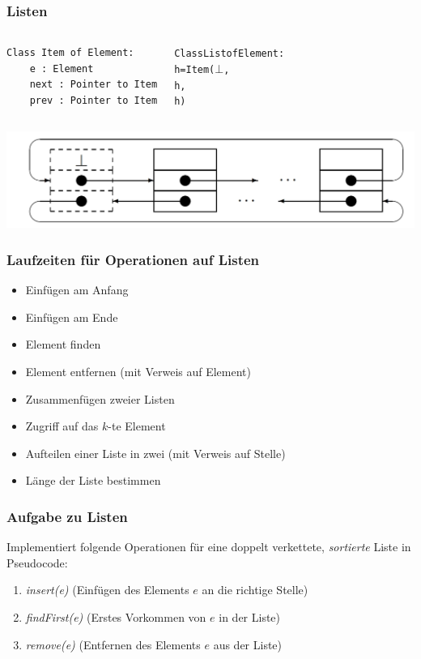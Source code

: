 \begin{frame}[fragile]
	\frametitle{Listen}
	\begin{columns}[t]
\begin{verbatim}
Class Item of Element:
    e : Element
    next : Pointer to Item
    prev : Pointer to Item
\end{verbatim}
\begin{alltt}
Class List of Element:
    h = Item(\(\bot\),
      h,
      h)
\end{alltt}
	\end{columns}
	\includegraphics[width=\textwidth]{images/list}
\end{frame}

\begin{frame}
	\frametitle{Laufzeiten für Operationen auf Listen}
	\begin{itemize}
		\item Einfügen am Anfang \only<2->{\textbf{$\mathcal{O}(1)$}}
		\item Einfügen am Ende \only<3->{\textbf{$\mathcal{O}(1)$}}
		\item Element finden \only<4->{\textbf{$\mathcal{O}(n)$}}
		\item Element entfernen (mit Verweis auf Element) \only<5->{\textbf{$\mathcal{O}(1)$}}
		\item Zusammenfügen zweier Listen \only<6->{\textbf{$\mathcal{O}(1)$}}
		\item Zugriff auf das $k$-te Element \only<7->{\textbf{$\mathcal{O}(n)$}}
		\item Aufteilen einer Liste in zwei (mit Verweis auf Stelle) \only<8->{\textbf{$\mathcal{O}(1)$}}
		\item Länge der Liste bestimmen \only<9->{\textbf{$\mathcal{O}(n)$}}
	\end{itemize}
\end{frame}

\begin{frame}
	\frametitle{Aufgabe zu Listen}
	Implementiert folgende Operationen für eine doppelt verkettete, \emph{sortierte} Liste in Pseudocode:

	\begin{enumerate}
		\item \emph{insert(e)} (Einfügen des Elements $e$ an die richtige Stelle)
		\item \emph{findFirst(e)} (Erstes Vorkommen von $e$ in der Liste)
		\item \emph{remove(e)} (Entfernen des Elements $e$ aus der Liste)
	\end{enumerate}
\end{frame}


